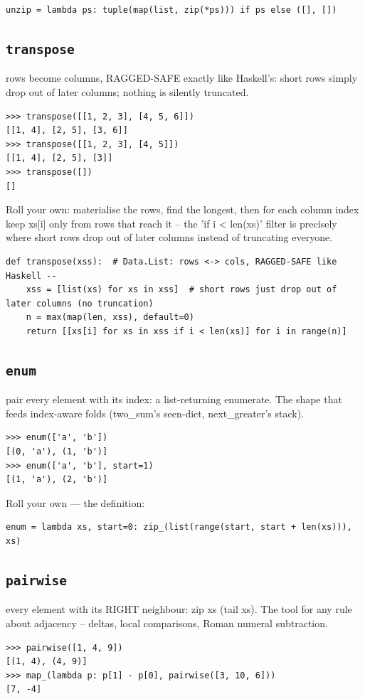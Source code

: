 \documentclass[10pt,letterpaper]{book}
\begin{document}
\begin{lstlisting}[style=ex]
unzip = lambda ps: tuple(map(list, zip(*ps))) if ps else ([], [])
\end{lstlisting}
\subsection{\texttt{transpose}}\label{def:transpose}
rows become columns, RAGGED-SAFE exactly like Haskell's: short rows simply drop out of later columns; nothing is silently truncated.
\begin{lstlisting}[style=ex]
>>> transpose([[1, 2, 3], [4, 5, 6]])
[[1, 4], [2, 5], [3, 6]]
>>> transpose([[1, 2, 3], [4, 5]])
[[1, 4], [2, 5], [3]]
>>> transpose([])
[]
\end{lstlisting}

Roll your own: materialise the rows, find the longest, then for each column index keep xs[i] only from rows that reach it -- the 'if i < len(xs)' filter is precisely where short rows drop out of later columns instead of truncating everyone.

\begin{lstlisting}[style=ex]
def transpose(xss):  # Data.List: rows <-> cols, RAGGED-SAFE like Haskell --
    xss = [list(xs) for xs in xss]  # short rows just drop out of later columns (no truncation)
    n = max(map(len, xss), default=0)
    return [[xs[i] for xs in xss if i < len(xs)] for i in range(n)]
\end{lstlisting}
\subsection{\texttt{enum}}\label{def:enum}
pair every element with its index: a list-returning enumerate. The shape that feeds index-aware folds (two\_sum's seen-dict, next\_greater's stack).
\begin{lstlisting}[style=ex]
>>> enum(['a', 'b'])
[(0, 'a'), (1, 'b')]
>>> enum(['a', 'b'], start=1)
[(1, 'a'), (2, 'b')]
\end{lstlisting}

Roll your own --- the definition:

\begin{lstlisting}[style=ex]
enum = lambda xs, start=0: zip_(list(range(start, start + len(xs))), xs)
\end{lstlisting}
\subsection{\texttt{pairwise}}\label{def:pairwise}
every element with its RIGHT neighbour: zip xs (tail xs). The tool for any rule about adjacency -- deltas, local comparisons, Roman numeral subtraction.
\begin{lstlisting}[style=ex]
>>> pairwise([1, 4, 9])
[(1, 4), (4, 9)]
>>> map_(lambda p: p[1] - p[0], pairwise([3, 10, 6]))
[7, -4]
\end{lstlisting}
\end{document}
